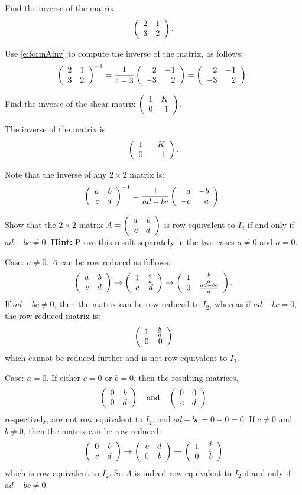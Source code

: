 \documentclass{ximera}
\begin{document}
\TEXER

\begin{exercise} \label{c4.9.1}
Find the inverse of the matrix
\[
\left(\begin{array}{rr} 2 & 1\\ 3 &2\end{array}\right).
\]

\begin{solution}

Use \eqref{e:formAinv} to compute the inverse of the matrix,
as follows:
\[ \left(\begin{array}{rr} 2 & 1\\ 3 &2\end{array}\right)^{-1} = \frac{1}{4-3}\left(\begin{array}{rr} 2 & -1\\ -3 &2\end{array}\right)
= \left(\begin{array}{rr} 2 & -1\\ -3 &2\end{array}\right). \]

\end{solution}
\end{exercise}

\begin{exercise} \label{c7.8.4}
Find the inverse of the shear matrix $\left(\begin{array}{rr} 1 & K\\ 0 &1\end{array}\right)$.

\begin{solution}

\ans The inverse of the matrix is
\[
\left(\begin{array}{rr} 1 & -K\\ 0 &1\end{array}\right).
\]

\soln Note that the inverse of any $2 \times 2$ matrix is:
\[ \left(\begin{array}{rr} a & b\\ c &d\end{array}\right)^{-1} = \frac{1}{ad - bc}\left(\begin{array}{rr} d & -b\\ -c &a\end{array}\right). \]


\end{solution}
\end{exercise}

\begin{exercise} \label{c4.9.4}
Show that the $2\times 2$ matrix $A=\left(\begin{array}{rr} a & b\\ c &d\end{array}\right)$ is row
equivalent to $I_2$ if and only if $ad-bc\neq 0$.  {\bf Hint:}
Prove this result separately in the two cases $a\neq 0$ and
$a=0$.

\begin{solution}

Case: $a \neq 0$.  $A$ can be row reduced as follows:
\[ \left(\begin{array}{rr} a & b\\ c &d\end{array}\right) \rightarrow
\left(\begin{array}{rr} 1 & \frac{b}{a}\\ c &d\end{array}\right) \rightarrow
\left(\begin{array}{cc} 1 & \frac{b}{a}\\ 0 &\frac{ad - bc}{a}\end{array}\right). \]
If $ad - bc \neq 0$, then the matrix can be row reduced to $I_2$, whereas
if $ad - bc = 0$, the row reduced matrix is:
\[ \left(\begin{array}{rr} 1 & \frac{b}{a}\\ 0 &0\end{array}\right) \]
which cannot be reduced further and is not row equivalent to $I_2$.

Case: $a = 0$.  If either $c = 0$ or $b = 0$, then the resulting matrices,
\[ \left(\begin{array}{rr} 0 & b\\ 0 &d\end{array}\right) \quad\mbox{and}\quad \left(\begin{array}{rr} 0 & 0\\ c &d\end{array}\right) \]
respectively, are not row equivalent to $I_2$, and $ad - bc = 0 - 0 = 0$.
If $c \neq 0$ and $b \neq 0$, then the matrix can be row reduced:
\[ \left(\begin{array}{rr} 0 & b\\ c &d\end{array}\right) \rightarrow
\left(\begin{array}{rr} c & d\\ 0 &b\end{array}\right) \rightarrow \left(\begin{array}{rr} 1 & \frac{d}{c}\\ 0 &b\end{array}\right) \]
which is row equivalent to $I_2$.  So $A$ is indeed row equivalent
to $I_2$ if and only if $ad - bc \neq 0$.

\end{solution}
\end{exercise}
\end{document}
